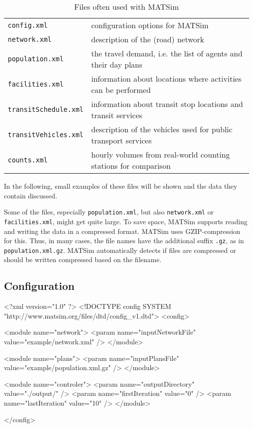 \begin{table}[htp]
\begin{tabular}{ll}
\hline
{\tt config.xml}          & configuration options for MATSim \\
{\tt network.xml}         & description of the (road) network \\
{\tt population.xml}      & the travel demand, i.e. the list of agents
and their day plans
\\
{\tt facilities.xml}      & information about locations where
activities can be performed\\
{\tt transitSchedule.xml} & information about transit stop locations
and transit services\\
{\tt transitVehicles.xml} & description of the vehicles used for
public transport services\\
{\tt counts.xml}          & hourly volumes from real-world counting
stations for comparison\\
\hline
\end{tabular}
\caption{Files often used with MATSim}
\label{tab:BuildingScenarios:InputDataSets}
\end{table}

In the following, small examples of these files will be shown and the data they
contain discussed.

\begin{note}
Some of the files, especially {\tt population.xml}, but also {\tt network.xml} 
or {\tt facilities.xml}, might get quite large. To save space, MATSim supports
reading and writing the data in a compressed format. MATSim uses  
GZIP-compression for this. Thus, in many cases, the file names have the 
additional suffix {\tt .gz}, as in {\tt population.xml.gz}. MATSim automatically
detects if files are compressed or should be written compressed based on the 
filename.
\end{note}

\subsection{Configuration}

\begin{xml-file}[caption=An example of a config.xml,
label=lst:BuildingScenarios:configXml]
<?xml version="1.0" ?>
<!DOCTYPE config SYSTEM "http://www.matsim.org/files/dtd/config_v1.dtd">
<config>

	<module name="network">
		<param name="inputNetworkFile" value="example/network.xml" />
	</module>

	<module name="plans">
		<param name="inputPlansFile" value="example/population.xml.gz" />
	</module>

	<module name="controler">
		<param name="outputDirectory" value="./output/" />
		<param name="firstIteration" value="0" />
		<param name="lastIteration" value="10" />
	</module>
	
</config>
\end{xml-file}

